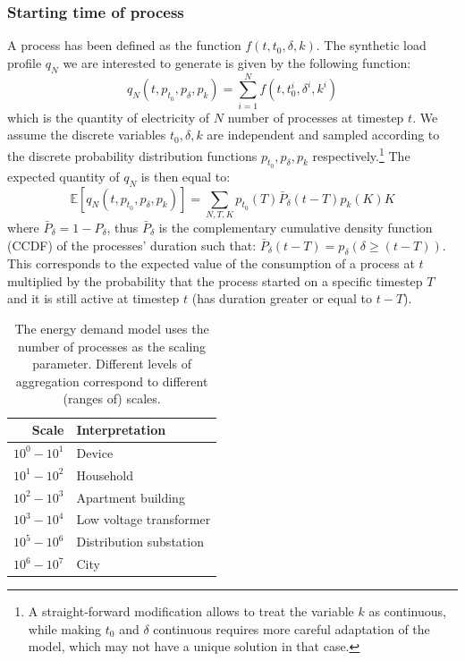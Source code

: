 \documentclass[conference]{IEEEtran}
\begin{document}
\subsubsection{Starting time of process}
A process has been defined as the function $f(t, t_0, \delta, k)$. The synthetic load profile $q_N$ we are interested to generate is given by the following function:
\begin{equation}\label{eq:GenerateSynthetic}
q_N(t, p_{t_0}, p_{\delta}, p_k) = \sum_{i=1}^N f(t, t_0^i, \delta^i, k^i)
\end{equation}
which is the quantity of electricity of $N$ number of processes at timestep $t$. We assume the discrete variables $t_0, \delta, k$ are independent and sampled according to the discrete probability distribution functions $p_{t_0}, p_{\delta}, p_k$ respectively.\footnote{A straight-forward modification allows to treat the variable $k$ as continuous, while making $t_0$ and $\delta$ continuous requires more careful adaptation of the model, which may not have a unique solution in that case.} The expected quantity of $q_N$ is then equal to:
\begin{equation}\label{eq:expectedQuantity}
\mathbb{E}\left[ q_N(t, p_{t_0}, p_{\delta}, p_k) \right] = \sum_{N, T, K} p_{t_0}(T) \bar{P}_{\delta} (t-T) p_k(K) K
\end{equation}
where $\bar{P}_{\delta} = 1 - P_{\delta}$, thus $\bar{P}_{\delta}$ is the complementary cumulative density function (CCDF) of the processes' duration such that: $\bar{P}_{\delta}(t-T) = p_{\delta}(\delta \geq (t-T))$. This corresponds to the expected value of the consumption of a process at $t$ multiplied by the probability that the process started on a specific timestep $T$ and it is still active at timestep $t$ (has duration greater or equal to $t-T$).

\begin{table}[t]
\caption{The energy demand model uses the number of processes as the scaling parameter. Different levels of aggregation correspond to different (ranges of) scales.}
\normalsize\centering\begin{tabular}{ r | l }
\toprule
	Scale & Interpretation \\ 
\midrule
  $10^0 - 10^1$ & Device \\
  $10^1 - 10^2$ & Household \\
  $10^2 - 10^3$ & Apartment building \\
  $10^3 - 10^4$ & Low voltage transformer \\
  $10^5 - 10^6$ & Distribution substation \\
  $10^6 - 10^7$ & City \\
\bottomrule
\end{tabular}
\label{tab:sizeInter}
\end{table}
\end{document}
